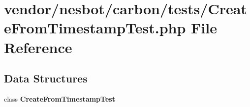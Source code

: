 \section{vendor/nesbot/carbon/tests/\+Create\+From\+Timestamp\+Test.php File Reference}
\label{_create_from_timestamp_test_8php}
\subsection*{Data Structures}
\begin{DoxyCompactItemize}
\item 
class {\bf Create\+From\+Timestamp\+Test}
\end{DoxyCompactItemize}
